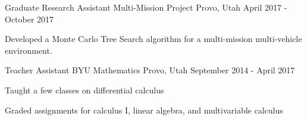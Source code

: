 \begin{cventries}
  \cventry
    {Graduate Research Assistant}
    {Multi-Mission Project}
    {Provo, Utah}
    {April 2017 - October 2017}
    {
      \begin{cvitems}
        \item Developed a Monte Carlo Tree Search algorithm for a multi-mission multi-vehicle environment.
      \end{cvitems}
    }
  \cventry
    {Teacher Assistant}
    {BYU Mathematics}
    {Provo, Utah}
    {September 2014 - April 2017}
    {
      \begin{cvitems}
        \item Taught a few classes on differential calculus
        \item Graded assignments for calculus I, linear algebra, and multivariable calculus
      \end{cvitems}
    }

\end{cventries}
